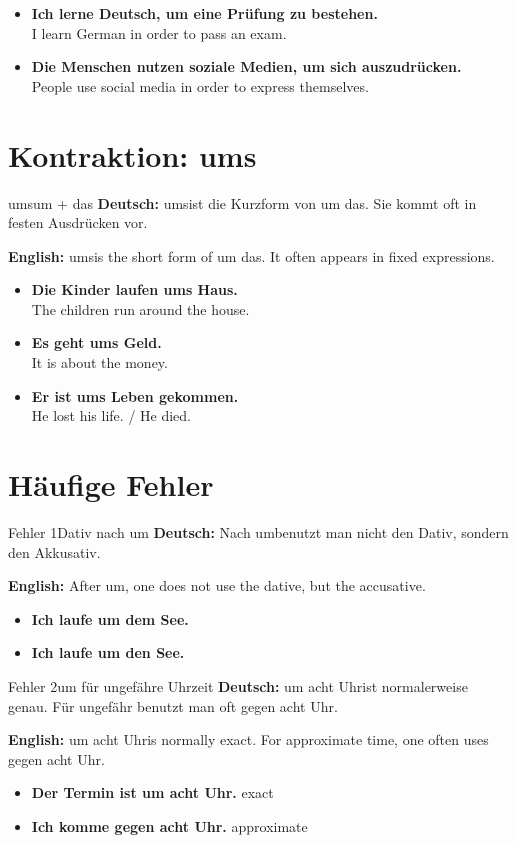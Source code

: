 \documentclass[a4paper,11pt]{article}
\newcommand{\GermanText}[1]{\textbf{Deutsch: }#1\par}
\newcommand{\EnglishText}[1]{{\small\color{SoftGray}\textbf{English: }#1\par}}
\newcommand{\ExampleItem}[2]{\item \textbf{#1}\\{\small\color{SoftGray}#2}}
\newcommand{\Correct}[1]{\textcolor{HeaderBlueDark}{\textbf{#1}}}
\newcommand{\Wrong}[1]{\textcolor{red!70!black}{\textbf{#1}}}
\begin{document}
\begin{exbox}
\begin{itemize}
    \ExampleItem{Ich lerne Deutsch, um eine Prüfung zu bestehen.}{I learn German in order to pass an exam.}
    \ExampleItem{Die Menschen nutzen soziale Medien, um sich auszudrücken.}{People use social media in order to express themselves.}
\end{itemize}
\end{exbox}

\section{Kontraktion: ums}

\begin{grammarentry}{ums}{um + das}
\GermanText{\glqq ums\grqq ist die Kurzform von \glqq um das\grqq. Sie kommt oft in festen Ausdrücken vor.}
\EnglishText{\glqq ums\grqq is the short form of \glqq um das\grqq. It often appears in fixed expressions.}
\end{grammarentry}

\begin{exbox}
\begin{itemize}
    \ExampleItem{Die Kinder laufen ums Haus.}{The children run around the house.}
    \ExampleItem{Es geht ums Geld.}{It is about the money.}
    \ExampleItem{Er ist ums Leben gekommen.}{He lost his life. / He died.}
\end{itemize}
\end{exbox}

\section{Häufige Fehler}

\begin{grammarentry}{Fehler 1}{Dativ nach um}
\GermanText{Nach \glqq um\grqq benutzt man nicht den Dativ, sondern den Akkusativ.}
\EnglishText{After \glqq um\grqq, one does not use the dative, but the accusative.}
\begin{itemize}
    \item \Wrong{Ich laufe um dem See.}
    \item \Correct{Ich laufe um den See.}
\end{itemize}
\end{grammarentry}

\begin{grammarentry}{Fehler 2}{um für ungefähre Uhrzeit}
\GermanText{\glqq um acht Uhr\grqq ist normalerweise genau. Für ungefähr benutzt man oft \glqq gegen acht Uhr\grqq.}
\EnglishText{\glqq um acht Uhr\grqq is normally exact. For approximate time, one often uses \glqq gegen acht Uhr\grqq.}
\begin{itemize}
    \item \Correct{Der Termin ist um acht Uhr.} \hfill exact
    \item \Correct{Ich komme gegen acht Uhr.} \hfill approximate
\end{itemize}
\end{grammarentry}
\end{document}
